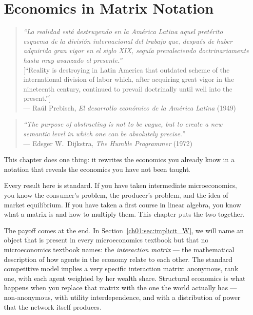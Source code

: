 \documentclass[../structural_economics_book.tex]{subfiles}
\begin{document}
\ifSubfilesClassLoaded{\setcounter{chapter}{0}}{}
\chapter{Economics in Matrix Notation}\label{ch:01}
\begin{quote}
\textit{``La realidad est\'{a} destruyendo en la Am\'{e}rica Latina aquel pret\'{e}rito esquema de la divisi\'{o}n internacional del trabajo que, despu\'{e}s de haber adquirido gran vigor en el siglo XIX, segu\'{i}a prevaleciendo doctrinariamente hasta muy avanzado el presente.''}\\[0.3em]
\textnormal{[``Reality is destroying in Latin America that outdated scheme of the international division of labor which, after acquiring great vigor in the nineteenth century, continued to prevail doctrinally until well into the present.'']}\\
\hfill --- Ra\'{u}l Prebisch, \textit{El desarrollo econ\'{o}mico de la Am\'{e}rica Latina} (1949)
\end{quote}
\nocite{prebisch1949desarrollo}

\begin{quote}
\textit{``The purpose of abstracting is not to be vague, but to create a new semantic level in which one can be absolutely precise.''}\\
\hfill --- Edsger W.\ Dijkstra, \textit{The Humble Programmer} (1972)
\end{quote}
\nocite{dijkstra1972humble}

\vspace{1em}

This chapter does one thing: it rewrites the economics you already know in a notation that reveals the economics you have not been taught.

Every result here is standard. If you have taken intermediate microeconomics, you know the consumer's problem, the producer's problem, and the idea of market equilibrium. If you have taken a first course in linear algebra, you know what a matrix is and how to multiply them. This chapter puts the two together.

The payoff comes at the end. In Section~\ref{ch01:sec:implicit_W}, we will name an object that is present in every microeconomics textbook but that no microeconomics textbook names: the \textit{interaction matrix} --- the mathematical description of how agents in the economy relate to each other. The standard competitive model implies a very specific interaction matrix: anonymous, rank one, with each agent weighted by her wealth share. Structural economics is what happens when you replace that matrix with the one the world actually has --- non-anonymous, with utility interdependence, and with a distribution of power that the network itself produces.
\end{document}
